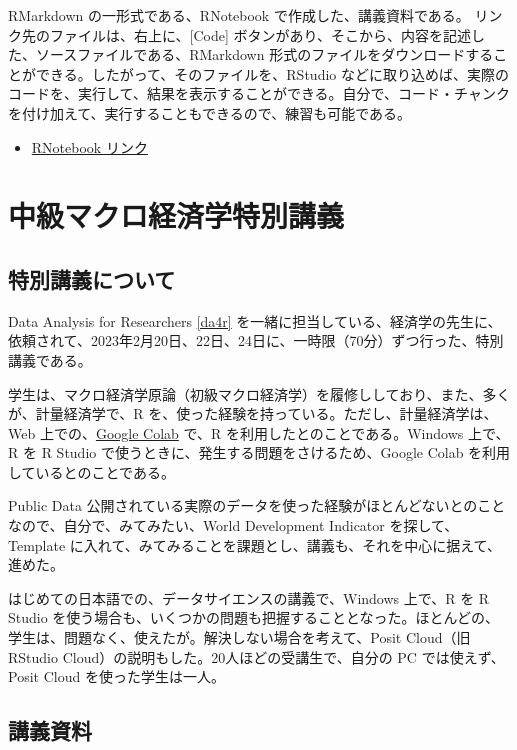 \documentclass[
]{bxjsbook}
\providecommand{\tightlist}{%
  \setlength{\itemsep}{0pt}\setlength{\parskip}{0pt}}
\theoremstyle{definition}
\theoremstyle{definition}
\theoremstyle{definition}
\theoremstyle{definition}
\theoremstyle{remark}
\begin{document}
RMarkdown の一形式である、RNotebook で作成した、講義資料である。
リンク先のファイルは、右上に、{[}Code{]} ボタンがあり、そこから、内容を記述した、ソースファイルである、RMarkdown 形式のファイルをダウンロードすることができる。したがって、そのファイルを、RStudio などに取り込めば、実際のコードを、実行して、結果を表示することができる。自分で、コード・チャンクを付け加えて、実行することもできるので、練習も可能である。

\begin{itemize}
\tightlist
\item
  \href{https://ds-sl.github.io/intro2r/intro2r.nb.html}{RNotebook リンク}
\end{itemize}

\hypertarget{eco232}{%
\section{中級マクロ経済学特別講義}\label{eco232}}

\hypertarget{ux7279ux5225ux8b1bux7fa9ux306bux3064ux3044ux3066}{%
\subsection{特別講義について}\label{ux7279ux5225ux8b1bux7fa9ux306bux3064ux3044ux3066}}

Data Analysis for Researchers \ref{da4r} を一緒に担当している、経済学の先生に、依頼されて、2023年2月20日、22日、24日に、一時限（70分）ずつ行った、特別講義である。

学生は、マクロ経済学原論（初級マクロ経済学）を履修ししており、また、多くが、計量経済学で、R を、使った経験を持っている。ただし、計量経済学は、Web 上での、\href{https://research.google.com/colaboratory/faq.html}{Google Colab} で、R を利用したとのことである。Windows 上で、R を R Studio で使うときに、発生する問題をさけるため、Google Colab を利用しているとのことである。

Public Data 公開されている実際のデータを使った経験がほとんどないとのことなので、自分で、みてみたい、World Development Indicator を探して、Template に入れて、みてみることを課題とし、講義も、それを中心に据えて、進めた。

はじめての日本語での、データサイエンスの講義で、Windows 上で、R を R Studio を使う場合も、いくつかの問題も把握することとなった。ほとんどの、学生は、問題なく、使えたが。解決しない場合を考えて、Posit Cloud（旧 RStudio Cloud）の説明もした。20人ほどの受講生で、自分の PC では使えず、Posit Cloud を使った学生は一人。

\hypertarget{ux8b1bux7fa9ux8cc7ux6599-1}{%
\subsection{講義資料}\label{ux8b1bux7fa9ux8cc7ux6599-1}}
\end{document}
